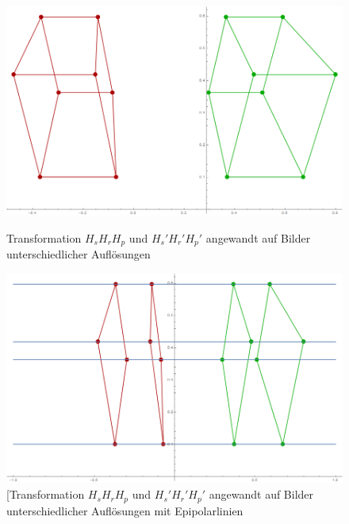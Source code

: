 

\begin{figure}[!htb]
	\includegraphics[width=\linewidth]{images/Rectification_HsHrHp_different_Solutions.png}
	\caption[Transformation $H_sH_rH_p$ und $H_s'H_r'H_p'$ bei unterschiedlicher Auflösungen]{Transformation $H_sH_rH_p$ und $H_s'H_r'H_p'$ angewandt auf Bilder unterschiedlicher Auflösungen}
	\label{fig:AbbRecDifResHsHrHp}
	\endminipage\hfill
			\includegraphics[width=\linewidth]{images/Rectification_four_different_Solutions.png}
	\caption[Transformation $H_sH_rH_p$ und $H_s'H_r'H_p'$ mit Epipolarlinien]{[Transformation $H_sH_rH_p$ und $H_s'H_r'H_p'$ angewandt auf Bilder unterschiedlicher Auflösungen mit Epipolarlinien}
	\label{fig:AbbRecDifResHsHrHpLines}
	\endminipage\hfill
\end{figure}
\pagebreak



